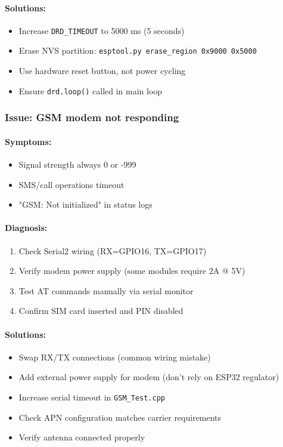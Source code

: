 \documentclass[11pt,a4paper]{article}
\begin{document}
\paragraph{Solutions:}
\begin{itemize}[leftmargin=*]
  \item Increase \texttt{DRD\_TIMEOUT} to 5000 ms (5 seconds)
  \item Erase NVS partition: \texttt{esptool.py erase\_region 0x9000 0x5000}
  \item Use hardware reset button, not power cycling
  \item Ensure \texttt{drd.loop()} called in main loop
\end{itemize}

\subsubsection{Issue: GSM modem not responding}

\paragraph{Symptoms:}
\begin{itemize}[leftmargin=*]
  \item Signal strength always 0 or -999
  \item SMS/call operations timeout
  \item "GSM: Not initialized" in status logs
\end{itemize}

\paragraph{Diagnosis:}
\begin{enumerate}[leftmargin=*]
  \item Check Serial2 wiring (RX=GPIO16, TX=GPIO17)
  \item Verify modem power supply (some modules require 2A @ 5V)
  \item Test AT commands manually via serial monitor
  \item Confirm SIM card inserted and PIN disabled
\end{enumerate}

\paragraph{Solutions:}
\begin{itemize}[leftmargin=*]
  \item Swap RX/TX connections (common wiring mistake)
  \item Add external power supply for modem (don't rely on ESP32 regulator)
  \item Increase serial timeout in \texttt{GSM\_Test.cpp}
  \item Check APN configuration matches carrier requirements
  \item Verify antenna connected properly
\end{itemize}
\end{document}
